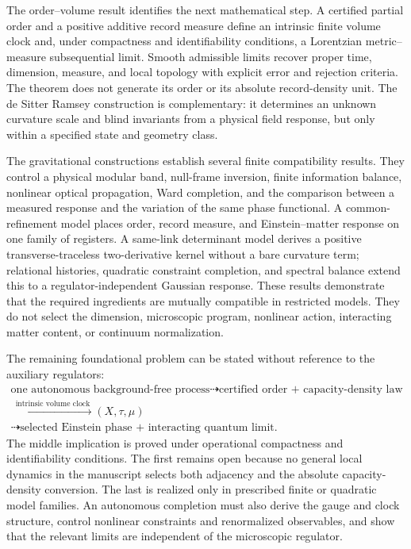The order--volume result identifies the next mathematical step.  A certified
partial order and a positive additive record measure define an intrinsic
finite volume clock and, under compactness and identifiability conditions, a
Lorentzian metric--measure subsequential limit.  Smooth admissible limits
recover proper time, dimension, measure, and local topology with explicit
error and rejection criteria.  The theorem does not generate its order or
its absolute record-density unit.  The de Sitter Ramsey construction is
complementary: it determines an unknown curvature scale and blind invariants
from a physical field response, but only within a specified state and
geometry class.

The gravitational constructions establish several finite compatibility
results.  They control a physical modular band, null-frame inversion,
finite information balance, nonlinear optical propagation, Ward completion,
and the comparison between a measured response and the variation of the same
phase functional.  A common-refinement model places order, record measure,
and Einstein--matter response on one family of registers.  A same-link
determinant model derives a positive transverse-traceless two-derivative
kernel without a bare curvature term; relational histories, quadratic
constraint completion, and spectral balance extend this to a
regulator-independent Gaussian response.  These results demonstrate that
the required ingredients are mutually compatible in restricted models.
They do not select the dimension, microscopic program, nonlinear action,
interacting matter content, or continuum normalization.

The remaining foundational problem can be stated without reference to the
auxiliary regulators:
\begin{equation}
 \boxed{\begin{gathered}
 \text{one autonomous background-free process}
 \dashrightarrow
 \text{certified order + capacity-density law}\\
 \xrightarrow{\ \text{intrinsic volume clock}\ }
 (X,\tau,\mu)\\
 \dashrightarrow
 \text{selected Einstein phase + interacting quantum limit}.
 \end{gathered}}
 \label{eq:updated-open-core}
\end{equation}
The middle implication is proved under operational compactness and
identifiability conditions.  The first remains open because no general local
dynamics in the manuscript selects both adjacency and the absolute
capacity-density conversion.  The last is realized only in prescribed
finite or quadratic model families.  An autonomous completion must also
derive the gauge and clock structure, control nonlinear constraints and
renormalized observables, and show that the relevant limits are independent
of the microscopic regulator.

